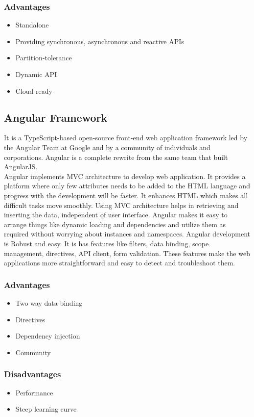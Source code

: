 \documentclass[a4paper, hidelinks, 12pt]{report}
\begin{document}
\subsubsection{Advantages}
\begin{itemize}
\item{} Standalone
\item{} Providing synchronous, asynchronous and reactive APIs
\item{} Partition-tolerance
\item{} Dynamic API
\item{} Cloud ready
\end{itemize}


\subsection{Angular Framework}
It is a TypeScript-based open-source front-end web application framework led by the Angular Team at Google and by a community of individuals and corporations. Angular is a complete rewrite from the same team that built AngularJS.\\

Angular implements MVC architecture to develop web application. It provides a platform where only few attributes needs to be added to the HTML language and progress with the development will be faster. It enhances HTML which makes all difficult tasks move smoothly. Using MVC architecture helps in retrieving and inserting the data, independent of user interface. Angular makes it easy to arrange things like dynamic loading and dependencies and utilize them as required without worrying about instances and namespaces. Angular development is Robust and easy. It is has features like filters, data binding, scope management, directives, API client, form validation. These features make the web applications more straightforward and easy to detect and troubleshoot them.
\subsubsection{Advantages}
\begin{itemize}
\item{} Two way data binding
\item{} Directives
\item{} Dependency injection
\item{} Community
\end{itemize}
\subsubsection{Disadvantages}
\begin{itemize}
\item{} Performance
\item{} Steep learning curve

\end{itemize}
\end{document}
